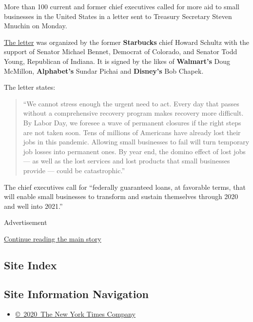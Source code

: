 More than 100 current and former chief executives called for more aid to
small businesses in the United States in a letter sent to Treasury
Secretary Steven Mnuchin on Monday.

\href{https://www.howardschultz.com/lettertocongress/}{The letter} was
organized by the former \textbf{Starbucks} chief Howard Schultz with the
support of Senator Michael Bennet, Democrat of Colorado, and Senator
Todd Young, Republican of Indiana. It is signed by the likes of
\textbf{Walmart's} Doug McMillon, \textbf{Alphabet's} Sundar Pichai and
\textbf{Disney's} Bob Chapek.

The letter states:

\begin{quote}
``We cannot stress enough the urgent need to act. Every day that passes
without a comprehensive recovery program makes recovery more difficult.
By Labor Day, we foresee a wave of permanent closures if the right steps
are not taken soon. Tens of millions of Americans have already lost
their jobs in this pandemic. Allowing small businesses to fail will turn
temporary job losses into permanent ones. By year end, the domino effect
of lost jobs --- as well as the lost services and lost products that
small businesses provide --- could be catastrophic.''
\end{quote}

The chief executives call for ``federally guaranteed loans, at favorable
terms, that will enable small businesses to transform and sustain
themselves through 2020 and well into 2021.''

Advertisement

\protect\hyperlink{after-bottom}{Continue reading the main story}

\hypertarget{site-index}{%
\subsection{Site Index}\label{site-index}}

\hypertarget{site-information-navigation}{%
\subsection{Site Information
Navigation}\label{site-information-navigation}}

\begin{itemize}
\tightlist
\item
  \href{https://help.nytimes3xbfgragh.onion/hc/en-us/articles/115014792127-Copyright-notice}{©~2020~The
  New York Times Company}
\end{itemize}

